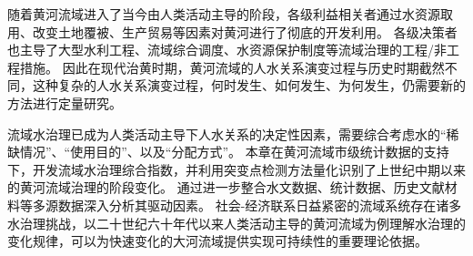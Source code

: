 随着黄河流域进入了当今由人类活动主导的阶段，各级利益相关者通过水资源取用、改变土地覆被、生产贸易等因素对黄河进行了彻底的开发利用。
各级决策者也主导了大型水利工程、流域综合调度、水资源保护制度等流域治理的工程/非工程措施。
因此在现代治黄时期，黄河流域的人\textendash{}水关系演变过程与历史时期截然不同，这种复杂的人\textendash{}水关系演变过程，何时发生、如何发生、为何发生，仍需要新的方法进行定量研究。

流域水治理已成为人类活动主导下人\textendash{}水关系的决定性因素，需要综合考虑水的“稀缺情况”、“使用目的”、以及“分配方式”。
本章在黄河流域市级统计数据的支持下，开发流域水治理综合指数，并利用突变点检测方法量化识别了上世纪中期以来的黄河流域治理的阶段变化。
通过进一步整合水文数据、统计数据、历史文献材料等多源数据深入分析其驱动因素。
社会-经济联系日益紧密的流域系统存在诸多水治理挑战，以二十世纪六十年代以来人类活动主导的黄河流域为例理解水治理的变化规律，可以为快速变化的大河流域提供实现可持续性的重要理论依据。
